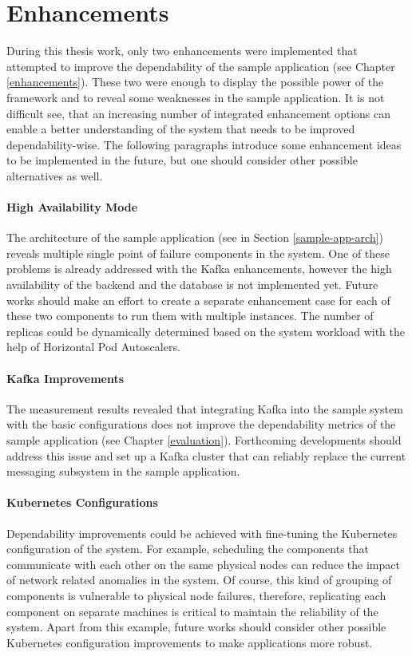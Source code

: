 \section{Enhancements}

During this thesis work, only two enhancements were implemented that attempted to improve the dependability of the sample application (see Chapter \ref{enhancements}). These two were enough to display the possible power of the framework and to reveal some weaknesses in the sample application. It is not difficult see, that an increasing number of integrated enhancement options can enable a better understanding of the system that needs to be improved dependability-wise. The following paragraphs introduce some enhancement ideas to be implemented in the future, but one should consider other possible alternatives as well.

\paragraph{High Availability Mode} The architecture of the sample application (see in Section \ref{sample-app-arch}) reveals multiple single point of failure components in the system. One of these problems is already addressed with the Kafka enhancements, however the high availability of the backend and the database is not implemented yet. Future works should make an effort to create a separate enhancement case for each of these two components to run them with multiple instances. The number of replicas could be dynamically determined based on the system workload with the help of Horizontal Pod Autoscalers.

\paragraph{Kafka Improvements} The measurement results revealed that integrating Kafka into the sample system with the basic configurations does not improve the dependability metrics of the sample application (see Chapter \ref{evaluation}). Forthcoming developments should address this issue and set up a Kafka cluster that can reliably replace the current messaging subsystem in the sample application. 

\paragraph{Kubernetes Configurations} Dependability improvements could be achieved with fine-tuning the Kubernetes configuration of the system. For example, scheduling the components that communicate with each other on the same physical nodes can reduce the impact of network related anomalies in the system. Of course, this kind of grouping of components is vulnerable to physical node failures, therefore, replicating each component on separate machines is critical to maintain the reliability of the system. Apart from this example, future works should consider other possible Kubernetes configuration improvements to make applications more robust.
